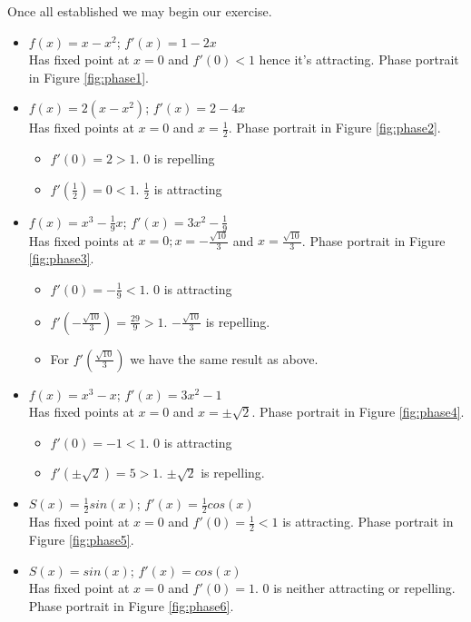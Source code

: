 \documentclass[11pt]{article}
\begin{document}
Once all established we may begin our exercise.
\begin{itemize}
    \item  $f(x) = x − x^2$; $f'(x) = 1 - 2x$\\Has fixed point at $x=0$ and $f'(0) < 1$ hence it's attracting. Phase portrait in Figure \ref{fig:phase1}.
    \item  $f(x) = 2(x − x^2)$; $f'(x) = 2 - 4x$\\Has fixed points at $x=0$ and $x=\frac{1}{2}$. Phase portrait in Figure \ref{fig:phase2}.
        \begin{itemize}
            \item  $f'(0) = 2 > 1$. 0 is repelling
            \item  $f'(\frac{1}{2}) = 0 < 1$. $\frac{1}{2}$ is attracting
        \end{itemize}
    \item $f(x) = x^3 − \frac{1}{9}x$; $f'(x) = 3x^2 - \frac{1}{9}$\\Has fixed points at $x=0; x= - \frac{\sqrt{10}}{3}$ and $ x= \frac{\sqrt{10}}{3}$.  Phase portrait in Figure \ref{fig:phase3}.
        \begin{itemize}
            \item  $f'(0) = -\frac{1}{9} < 1$. 0 is attracting
            \item  $f'(-\frac{\sqrt{10}}{3}) = \frac{29}{9} > 1$. $-\frac{\sqrt{10}}{3}$ is repelling.
            \item  For $f'(\frac{\sqrt{10}}{3})$ we have the same result as above.
        \end{itemize}
    \item $f(x) = x^3 − x$; $f'(x) = 3x^2 - 1$\\Has fixed points at $x=0$ and $x= \pm \sqrt{2}$. Phase portrait in Figure \ref{fig:phase4}.
        \begin{itemize}
            \item  $f'(0) = -1 < 1$. 0 is attracting
            \item  $f'(\pm\sqrt{2}) = 5 > 1$. $\pm\sqrt{2}$ is repelling.
        \end{itemize}
    \item $S(x) = \frac{1}{2}sin(x)$; $f'(x) = \frac{1}{2}cos(x)$\\Has fixed point at $x = 0$ and $f'(0) = \frac{1}{2} < 1$ is attracting. Phase portrait in Figure \ref{fig:phase5}.
    \item $S(x) = sin(x)$; $f'(x) = cos(x)$\\Has fixed point at $x = 0$ and $f'(0) = 1$. 0 is neither attracting or repelling. Phase portrait in Figure \ref{fig:phase6}.

\end{itemize}
\end{document}
